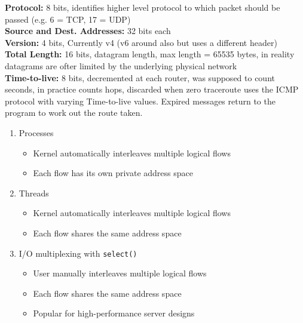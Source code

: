 \documentclass[number]{notes}
\begin{document}
\begin{landscape}
\begin{multicols}{3}
\textbf{Protocol:} 8 bits, identifies higher level protocol to which packet should be passed (e.g. 6 = TCP, 17 = UDP)\\
\textbf{Source and Dest. Addresses:} 32 bits each\\
\textbf{Version:} 4 bits, Currently v4 (v6 around also but uses a different header)\\
\textbf{Total Length:} 16 bits, datagram length, max length = 65535 bytes, in reality datagrams are ofter limited by the underlying physical network\\
\textbf{Time-to-live:} 8 bits, decremented at each router, was supposed to count seconds, in practice counts hops, discarded when zero
traceroute uses the ICMP protocol with varying Time-to-live values. Expired messages return to the program to work out the route taken.

\begin{enumerate}[nolistsep]
    \item Processes
    \begin{itemize}[nolistsep]
        \item Kernel automatically interleaves multiple logical flows
        \item Each flow has its own private address space
    \end{itemize}
    \item Threads
    \begin{itemize}[nolistsep]
        \item Kernel automatically interleaves multiple logical flows
        \item Each flow shares the same address space
    \end{itemize}
    \item I/O multiplexing with \texttt{select()}
    \begin{itemize}[nolistsep]
        \item User manually interleaves multiple logical flows
        \item Each flow shares the same address space
        \item Popular for high-performance server designs
    \end{itemize}
\end{enumerate}


\end{multicols}
\end{landscape}
\end{document}
